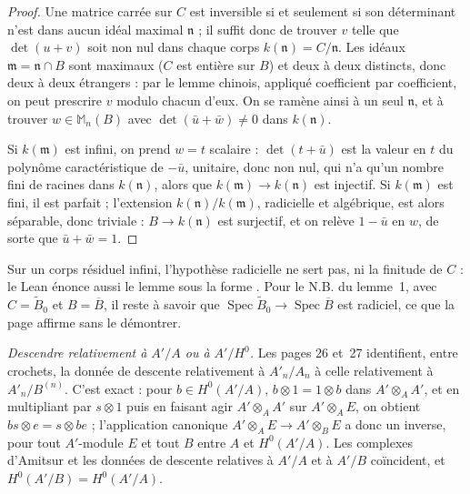 \begin{proof}
Une matrice carrée sur $C$ est inversible si et seulement si son déterminant n'est dans aucun idéal maximal $\mathfrak n$ ; il suffit donc de trouver $v$ telle que $\det(u + v)$ soit non nul dans chaque corps $k(\mathfrak n) = C/\mathfrak n$. Les idéaux $\mathfrak m = \mathfrak n \cap B$ sont maximaux ($C$ est entière sur $B$) et deux à deux distincts, donc deux à deux étrangers : par le lemme chinois, appliqué coefficient par coefficient, on peut prescrire $v$ modulo chacun d'eux. On se ramène ainsi à un seul $\mathfrak n$, et à trouver $w \in \mathbb M_n(B)$ avec $\det(\bar u + \bar w) \neq 0$ dans $k(\mathfrak n)$.

Si $k(\mathfrak m)$ est infini, on prend $w = t$ scalaire : $\det(t + \bar u)$ est la valeur en $t$ du polynôme caractéristique de $-\bar u$, unitaire, donc non nul, qui n'a qu'un nombre fini de racines dans $k(\mathfrak n)$, alors que $k(\mathfrak m) \to k(\mathfrak n)$ est injectif. Si $k(\mathfrak m)$ est fini, il est parfait ; l'extension $k(\mathfrak n)/k(\mathfrak m)$, radicielle et algébrique, est alors séparable, donc triviale : $B \to k(\mathfrak n)$ est surjectif, et on relève $1 - \bar u$ en $w$, de sorte que $\bar u + \bar w = 1$.
\end{proof}

\begin{remarque}
Sur un corps résiduel infini, l'hypothèse radicielle ne sert pas, ni la finitude de $C$ : le Lean énonce aussi le lemme sous la forme . Pour le N.B. du lemme~1, avec $C = \widetilde B_0$ et $B = \overline B$, il reste à savoir que $\operatorname{Spec} \widetilde B_0 \to \operatorname{Spec} \overline B$ est radiciel, ce que la page affirme sans le démontrer.
\end{remarque}

\noindent\emph{Descendre relativement à $A'/A$ ou à $A'/H^0$.} Les pages 26 et~27 identifient, entre crochets, la donnée de descente relativement à $A'_n/A_n$ à celle relativement à $A'_n/B^{(n)}$. C'est exact : pour $b \in H^0(A'/A)$, $b \otimes 1 = 1 \otimes b$ dans $A' \otimes_A A'$, et en multipliant par $s \otimes 1$ puis en faisant agir $A' \otimes_A A'$ sur $A' \otimes_A E$, on obtient $bs \otimes e = s \otimes be$ ; l'application canonique $A' \otimes_A E \to A' \otimes_B E$ a donc un inverse, pour tout $A'$-module $E$ et tout $B$ entre $A$ et $H^0(A'/A)$. Les complexes d'Amitsur et les données de descente relatives à $A'/A$ et à $A'/B$ coïncident, et $H^0(A'/B) = H^0(A'/A)$.

